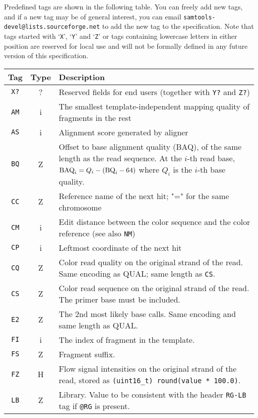 \documentclass[10pt]{article}
\begin{document}
{Predefined tags are shown in the following table. You can
  freely add new tags, and if a new tag may be of general interest, you
  can email {\tt samtools-devel@lists.sourceforge.net} to add the new tag
  to the specification. Note that tags started with `{\tt X}', `{\tt Y}'
  and `{\tt Z}' or tags containing lowercase letters in either position are reserved for local use and will not be formally
  defined in any future version of this specification.}
\begin{center}\small
\begin{tabular}{ccp{12.5cm}}
  \hline
  {\bf Tag\footnotemark[1]} & {\bf Type} & {\bf Description} \\
  \hline
  {\tt X?} & ? & Reserved fields for end users (together with {\tt Y?} and {\tt Z?}) \\
  {\tt AM} & i & The smallest template-independent mapping quality of fragments in the rest \\
  {\tt AS} & i & Alignment score generated by aligner \\
  {\tt BQ} & Z & Offset to base alignment quality (BAQ), of the same length as the read sequence.
  At the $i$-th read base, ${\rm BAQ}_i=Q_i-({\rm BQ}_i-64)$ where $Q_i$ is the $i$-th base quality. \\
  {\tt CC} & Z & Reference name of the next hit; "=" for the same chromosome \\
  {\tt CM} & i & Edit distance between the color sequence and the color reference (see also {\tt NM})\\
  {\tt CP} & i & Leftmost coordinate of the next hit \\ 
  {\tt CQ} & Z & Color read quality on the original strand of the read. Same encoding as {\sf QUAL}; same length as {\tt CS}.\\
  {\tt CS} & Z & Color read sequence on the original strand of the read. The primer base must be included.\\
  {\tt E2} & Z & The 2nd most likely base calls. Same encoding and same length as {\sf QUAL}.\\
  {\tt FI} & i & The index of fragment in the template.\\
  {\tt FS} & Z & Fragment suffix.\\
  {\tt FZ} & H & Flow signal intensities on the original strand of the read, stored as {\tt (uint16\_t) round(value * 100.0)}. \\
  {\tt LB} & Z & Library. Value to be consistent with the header {\tt RG-LB} tag if {\tt @RG} is present.\\

\end{tabular}
\end{center}
\end{document}
